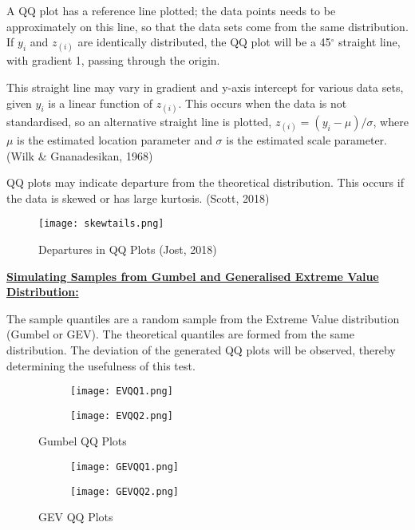 \documentclass{article}
\begin{document}
A QQ plot has a reference line plotted; the data points needs to be approximately on this line, so that the data sets come from the same distribution. If $y_i$ and $z_{(i)}$ are identically distributed, the QQ plot will be a 45$^{\circ}$ straight line, with gradient 1, passing through the origin.

This straight line may vary in gradient and y-axis intercept for various data sets, given $y_i$ is a linear function of $z_{(i)}$. This occurs when the data is not standardised, so an alternative straight line is plotted, $z_{(i)} = (y_i - \mu)/\sigma$, where $\mu$ is the estimated location parameter and $\sigma$ is the estimated scale parameter. (Wilk \&  Gnanadesikan, 1968)

QQ plots may indicate departure from the theoretical distribution. This occurs if the data is skewed or has large kurtosis. (Scott, 2018)
 \vspace*{-2mm} 
\begin{figure}[h]
 \centering
    \texttt{[image: skewtails.png]}
  \vspace*{-5mm} 
  \caption{Departures in QQ Plots (Jost, 2018)}
  \label{departuresinqqplots}
  \end{figure}

\underline{\textbf{Simulating Samples from Gumbel and Generalised Extreme Value Distribution:}} 
 
The sample quantiles are a random sample from the Extreme Value distribution (Gumbel or GEV). The theoretical quantiles are formed from the same distribution. The deviation of the generated QQ plots will be observed, thereby determining the usefulness of this test. 
 
\begin{figure}
\centering
\begin{subfigure}
  \centering
  \texttt{[image: EVQQ1.png]}
\end{subfigure}
\begin{subfigure}
  \centering
  \texttt{[image: EVQQ2.png]}
\end{subfigure}
  \vspace*{-5mm} 
\caption{Gumbel QQ Plots}
\label{gumbelqqplots}
\end{figure}
\begin{figure}
\centering
\begin{subfigure}
  \centering
  \texttt{[image: GEVQQ1.png]}
\end{subfigure}
\begin{subfigure}
  \centering
  \texttt{[image: GEVQQ2.png]}
\end{subfigure}
  \vspace*{-5mm} 
\caption{GEV QQ Plots}
\label{gevqqplots}
\end{figure}
\end{document}
